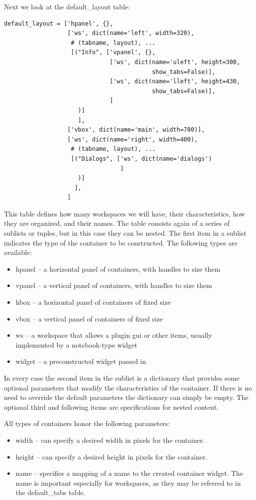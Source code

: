 \documentclass[11pt]{report}
\begin{document}
Next we look at the default\_layout table:
\begin{lstlisting}
default_layout = ['hpanel', {},
                  ['ws', dict(name='left', width=320),
                   # (tabname, layout), ...
                   [("Info", ['vpanel', {},
                              ['ws', dict(name='uleft', height=300,
                                          show_tabs=False)],
                              ['ws', dict(name='lleft', height=430,
                                          show_tabs=False)],
                              ]
                     )]
                     ],
                  ['vbox', dict(name='main', width=700)],
                  ['ws', dict(name='right', width=400),
                   # (tabname, layout), ...
                   [("Dialogs", ['ws', dict(name='dialogs')
                                 ]
                     )]
                    ],
                  ]
\end{lstlisting}
This table defines how many workspaces we will have, their
characteristics, how they are organized, and their names.
The table consists again of a series of sublists or tuples, but in this
case they can be nested.
The first item in a sublist indicates the type of the container to be
constructed.  The following types are available:
\begin{itemize}
\item hpanel -- a horizontal panel of containers, with handles to size them
\item vpanel -- a vertical panel of containers, with handles to size
  them
\item hbox -- a horizontal panel of containers of fixed size
\item vbox -- a vertical panel of containers of fixed size
\item ws -- a workspace that allows a plugin gui or other items, usually
  implemented by a notebook-type widget
\item widget -- a preconstructed widget passed in
\end{itemize}
In every case the second item in the sublist is a dictionary that
provides some optional parameters that modify the characteristics of the
container.
If there is no need to override the default parameters the dictionary
can simply be empty.
The optional third and following items are specifications for nested
content.

All types of containers honor the following parameters:
\begin{itemize}
\item width -- can specify a desired width in pixels for the container.
\item height -- can specify a desired height in pixels for the container.
\item name -- specifies a mapping of a name to the created container
  widget.  The name is important especially for workspaces, as they may
  be referred to in the default\_tabs table.
\end{itemize}
\end{document}
